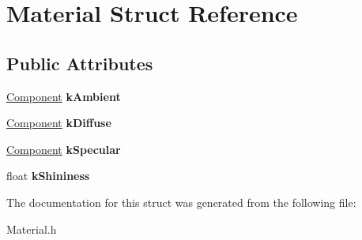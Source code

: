 \hypertarget{struct_material}{\section{Material Struct Reference}
\label{struct_material}
}
\subsection*{Public Attributes}
\begin{DoxyCompactItemize}
\item 
\hypertarget{struct_material_ab3819b3151cbf3ac1892195ab091e3b8}{\hyperlink{struct_component}{Component} {\bfseries k\+Ambient}}\label{struct_material_ab3819b3151cbf3ac1892195ab091e3b8}

\item 
\hypertarget{struct_material_aa88dd619cacf46e2f26ddd23fe032898}{\hyperlink{struct_component}{Component} {\bfseries k\+Diffuse}}\label{struct_material_aa88dd619cacf46e2f26ddd23fe032898}

\item 
\hypertarget{struct_material_a97cc0bf34b02c758b198d12dd24e96e2}{\hyperlink{struct_component}{Component} {\bfseries k\+Specular}}\label{struct_material_a97cc0bf34b02c758b198d12dd24e96e2}

\item 
\hypertarget{struct_material_a07cec8956c43f81adeb6ba7aea104915}{float {\bfseries k\+Shininess}}\label{struct_material_a07cec8956c43f81adeb6ba7aea104915}

\end{DoxyCompactItemize}


The documentation for this struct was generated from the following file\+:\begin{DoxyCompactItemize}
\item 
Material.\+h\end{DoxyCompactItemize}
